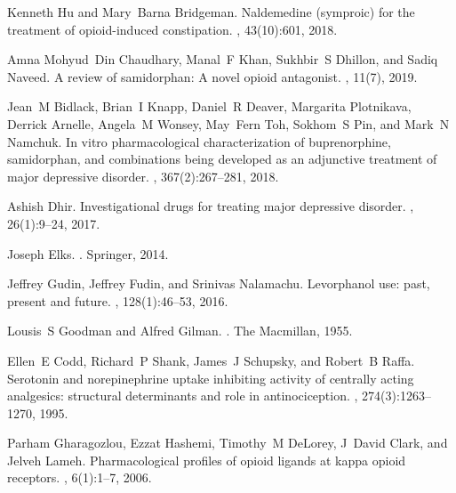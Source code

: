 \documentclass[10pt]{article}
\begin{document}
\begin{thebibliography}{10}
			Kenneth Hu and Mary~Barna Bridgeman.
			\newblock Naldemedine (symproic) for the treatment of opioid-induced
			constipation.
			, 43(10):601, 2018.
			
			Amna Mohyud~Din Chaudhary, Manal~F Khan, Sukhbir~S Dhillon, and Sadiq Naveed.
			\newblock A review of samidorphan: A novel opioid antagonist.
			, 11(7), 2019.
			
			Jean~M Bidlack, Brian~I Knapp, Daniel~R Deaver, Margarita Plotnikava, Derrick
			Arnelle, Angela~M Wonsey, May~Fern Toh, Sokhom~S Pin, and Mark~N Namchuk.
			\newblock In vitro pharmacological characterization of buprenorphine,
			samidorphan, and combinations being developed as an adjunctive treatment of
			major depressive disorder.
			,
			367(2):267--281, 2018.
			
			Ashish Dhir.
			\newblock Investigational drugs for treating major depressive disorder.
			, 26(1):9--24, 2017.
			
			Joseph Elks.
			.
			\newblock Springer, 2014.
			
			Jeffrey Gudin, Jeffrey Fudin, and Srinivas Nalamachu.
			\newblock Levorphanol use: past, present and future.
			, 128(1):46--53, 2016.
			
			Lousis~S Goodman and Alfred Gilman.
			.
			\newblock The Macmillan, 1955.
			
			Ellen~E Codd, Richard~P Shank, James~J Schupsky, and Robert~B Raffa.
			\newblock Serotonin and norepinephrine uptake inhibiting activity of centrally
			acting analgesics: structural determinants and role in antinociception.
			,
			274(3):1263--1270, 1995.
			
			Parham Gharagozlou, Ezzat Hashemi, Timothy~M DeLorey, J~David Clark, and Jelveh
			Lameh.
			\newblock Pharmacological profiles of opioid ligands at kappa opioid receptors.
			, 6(1):1--7, 2006.
			

\end{thebibliography}
\end{document}
